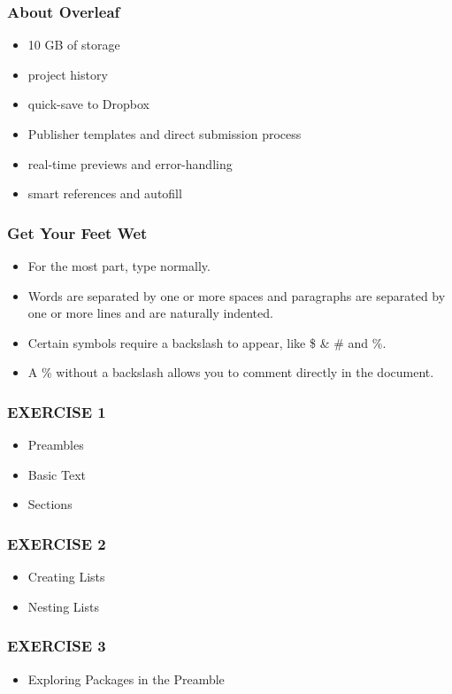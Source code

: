 \documentclass[12pt, compress]{beamer}
\begin{document}
\begin{frame}[fragile]
    \frametitle{About Overleaf}
    \begin{itemize}
        \item 10 GB of storage
        \item project history
        \item quick-save to Dropbox
        \item Publisher templates and direct submission process
        \item real-time previews and error-handling
        \item smart references and autofill
    \end{itemize}
\end{frame}

\begin{frame}[fragile]
    \frametitle{Get Your Feet Wet}
    \begin{itemize}
    \item For the most part, type normally.
    \item Words are separated by one or more spaces and paragraphs are separated by one or more lines and are naturally indented. 
    \item Certain symbols require a backslash to appear, like \$ \& \# and \%. 
    \item A \% without a backslash allows you to comment directly in the document.
  \end{itemize}
\end{frame}

\begin{frame}[fragile]
    \frametitle{EXERCISE 1}
        \begin{itemize}
        \item Preambles
        \item Basic Text
        \item Sections
    \end{itemize}
\end{frame}

\begin{frame}[fragile]
    \frametitle{EXERCISE 2}
    \begin{itemize}
        \item Creating Lists
        \item Nesting Lists
    \end{itemize}
\end{frame}

\begin{frame}[fragile]
    \frametitle{EXERCISE 3}
        \begin{itemize}
            \item Exploring Packages in the Preamble
        \end{itemize}
\end{frame}
\end{document}
